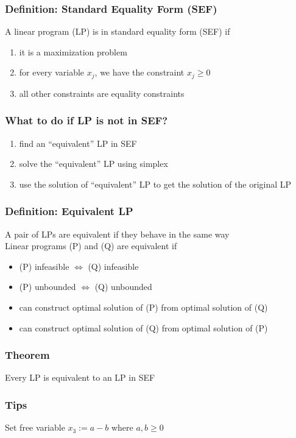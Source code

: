 \documentclass[11pt]{article}
\begin{document}
\subsubsection{Definition: Standard Equality Form (SEF)}
A linear program (LP) is in standard equality form (SEF) if 
\begin{enumerate}
  \item it is a maximization problem
  \item for every variable $x_j$, we have the constraint $x_j\geq 0$
  \item all other constraints are equality constraints
\end{enumerate}
\subsubsection{What to do if LP is not in SEF?}
\begin{enumerate}
  \item find an ``equivalent'' LP in SEF 
  \item solve the ``equivalent'' LP using simplex
  \item use the solution of ``equivalent'' LP to get the solution of the original LP
\end{enumerate}
\subsubsection{Definition: Equivalent LP}
A pair of LPs are equivalent if they behave in the same way \\
Linear programs (P) and (Q) are equivalent if 
\begin{itemize}
  \item (P) infeasible $\iff$ (Q) infeasible 
  \item (P) unbounded $\iff$ (Q) unbounded 
  \item can construct optimal solution of (P) from optimal solution of (Q)
  \item can construct optimal solution of (Q) from optimal solution of (P)
\end{itemize}
\subsubsection{Theorem}
Every LP is equivalent to an LP in SEF 
\subsubsection*{Tips}
Set free variable $x_3:=a-b$ where $a,b\geq0$
\end{document}
